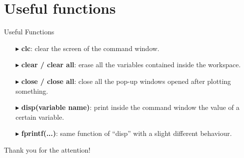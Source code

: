 \documentclass[xcolor={dvipsnames,rgb}, aspectratio=169]{beamer}
\begin{document}
\section{Useful functions}
\begin{frame}{Useful Functions}
\begin{itemize}
   \item[$\blacktriangleright$] \textbf{clc}: clear the screen of the command window.
   \item[$\blacktriangleright$] \textbf{clear / clear all}: erase all the variables
      contained inside the workspace.
   \item[$\blacktriangleright$] \textbf{close / close all}: close all the pop-up windows
      opened after plotting something.
   \item[$\blacktriangleright$] \textbf{disp(variable name)}: print inside the command
      window the value of a certain variable.
   \item[$\blacktriangleright$] \textbf{fprintf(...)}: same function of ``disp'' with a
      slight different behaviour.
\end{itemize}
\end{frame}

{%
   \begin{frame}[standout]
      Thank you for the attention!
   \end{frame}
}

\end{document}
